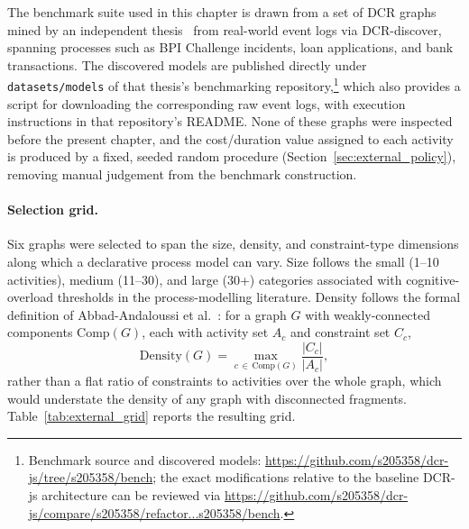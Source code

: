 The benchmark suite used in this chapter is drawn from a set of \ac{DCR}
graphs mined by an independent thesis~\cite{TobiasDCRDiscover} from
real-world event logs via \ac{DCR}-discover, spanning processes such as
BPI Challenge incidents, loan applications, and bank transactions. The
discovered models are published directly under \texttt{datasets/models}
of that thesis's benchmarking repository,\footnote{Benchmark source and
discovered models: \url{https://github.com/s205358/dcr-js/tree/s205358/bench};
the exact modifications relative to the baseline DCR-js architecture can
be reviewed via \url{https://github.com/s205358/dcr-js/compare/s205358/refactor...s205358/bench}.}
which also provides a script for downloading the corresponding raw
event logs, with execution instructions in that repository's README.
None of these graphs were inspected before the present chapter, and the
cost/duration value assigned to each activity is produced by a fixed,
seeded random procedure (Section~\ref{sec:external_policy}),
removing manual judgement from the benchmark construction.

\paragraph{Selection grid.}
Six graphs were selected to span the size, density, and constraint-type
dimensions along which a declarative process model can vary. Size
follows the small (1--10 activities), medium (11--30), and large (30+)
categories associated with cognitive-overload thresholds in the
process-modelling literature. Density follows the formal definition of
Abbad-Andaloussi et al.~\cite{AbbadAndaloussi2023Complexity}: for a
graph $G$ with weakly-connected components $\mathrm{Comp}(G)$, each
with activity set $A_c$ and constraint set $C_c$,
\[
  \mathrm{Density}(G) = \max_{c \,\in\, \mathrm{Comp}(G)} \frac{|C_c|}{|A_c|},
\]
rather than a flat ratio of constraints to activities over the whole
graph, which would understate the density of any graph with
disconnected fragments. Table~\ref{tab:external_grid} reports the
resulting grid.

